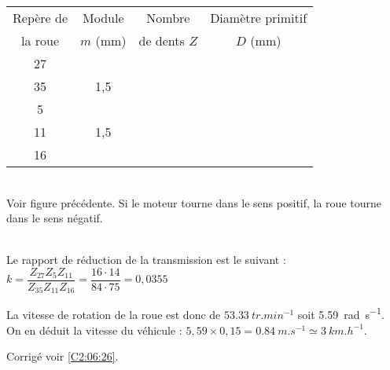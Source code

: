 \normalsize

\else
\footnotesize
\begin{center}
\begin{tabular}{|c|c|c|c|}
\hline
Repère de  & Module  & Nombre & Diamètre primitif  \\
la roue & $m$ (mm) & de dents $Z$ & $D$ (mm) \\
\hline
\hline
27 & & & \\ \hline
35 & 1,5& & \\ \hline
5& & & \\ \hline
11& 1,5 & & \\ \hline
16& & & \\ \hline

\end{tabular}
\end{center}

\normalsize
\fi


\ifprof ~\\
Voir figure précédente. Si le moteur tourne dans le sens positif, la roue tourne dans le sens négatif. 
\else
\fi

\ifprof ~\\
Le rapport de réduction de la transmission est le suivant : 
$k=\dfrac{Z_{27} Z_{5} Z_{11} }{Z_{35} Z_{11} Z_{16}} = \dfrac{16\cdot 14}{84\cdot 75} =0,0355 $

La vitesse de rotation de la roue est donc de $\SI{53,33}{tr.min^{-1}}$ soit \SI{5,59}{rad.s^{-1}}. 
On en déduit la vitesse du véhicule : $5,59 \times 0,15 = \SI{0,84}{m.s^{-1}}\simeq \SI{3}{km.h^{-1}}$.

\else
\fi

\ifprof
\else
\begin{flushright}
\footnotesize{Corrigé  voir \ref{C2:06:26}.}
\end{flushright}%
\fi